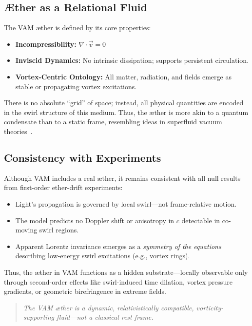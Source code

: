     \subsection{Æther as a Relational Fluid}

        The VAM æther is defined by its core properties:
        \begin{itemize}
            \item \textbf{Incompressibility:} $\nabla \cdot \vec{v} = 0$
            \item \textbf{Inviscid Dynamics:} No intrinsic dissipation; supports persistent circulation.
            \item \textbf{Vortex-Centric Ontology:} All matter, radiation, and fields emerge as stable or propagating vortex excitations.
        \end{itemize}

        There is no absolute “grid” of space; instead, all physical quantities are encoded in the swirl structure of this medium. Thus, the æther is more akin to a quantum condensate than to a static frame, resembling ideas in superfluid vacuum theories~\cite{volovik2003}.

    \subsection{Consistency with Experiments}

        Although VAM includes a real æther, it remains consistent with all null results from first-order ether-drift experiments:

        \begin{itemize}
            \item Light’s propagation is governed by local swirl—not frame-relative motion.
            \item The model predicts no Doppler shift or anisotropy in $c$ detectable in co-moving swirl regions.
            \item Apparent Lorentz invariance emerges as a \emph{symmetry of the equations} describing low-energy swirl excitations (e.g., vortex rings).
        \end{itemize}

        Thus, the æther in VAM functions as a hidden substrate—locally observable only through second-order effects like swirl-induced time dilation, vortex pressure gradients, or geometric birefringence in extreme fields.

        \begin{quote}
                \emph{The VAM æther is a dynamic, relativistically compatible, vorticity-supporting fluid---not a classical rest frame.}
        \end{quote}